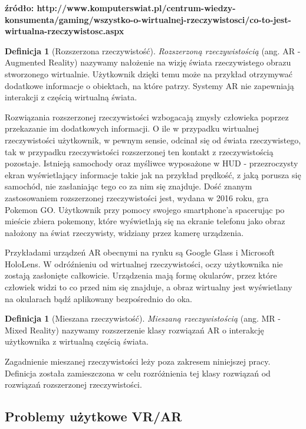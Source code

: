 \documentclass[a4paper,11pt,twoside]{report}
\theoremstyle{definition}
\newtheorem{definition}[theorem]{Definicja}
\begin{document}
\textbf {źródło: http://www.komputerswiat.pl/centrum-wiedzy-konsumenta/gaming/wszystko-o-wirtualnej-rzeczywistosci/co-to-jest-wirtualna-rzeczywistosc.aspx }

\begin{definition}[Rozszerzona rzeczywistość]
\textit{Rozszerzoną rzeczywistością} (ang. AR - Augmented Reality) nazywamy nałożenie na wizję świata rzeczywistego obrazu stworzonego wirtualnie. Użytkownik dzięki temu może na przykład otrzymywać dodatkowe informacje o obiektach, na które patrzy. Systemy AR nie zapewniają interakcji z częścią wirtualną świata.
\end{definition}

Rozwiązania rozszerzonej rzeczywistości wzbogacają zmysły człowieka poprzez przekazanie im dodatkowych informacji. O ile w przypadku wirtualnej rzeczywistości użytkownik, w pewnym sensie, odcinał się od świata rzeczywistego, tak w przypadku rzeczywistości rozszerzonej ten kontakt z rzeczywistością pozostaje. Istnieją samochody oraz myśliwce wyposażone w HUD - przezroczysty ekran wyświetlający informacje takie jak na przykład prędkość, z jaką porusza się samochód, nie zasłaniając tego co za nim się znajduje. Dość znanym zastosowaniem rozszerzonej rzeczywistości jest, wydana w 2016 roku, gra Pokemon GO. Użytkownik przy pomocy swojego smartphone'a spacerując po mieście zbiera pokemony, które wyświetlają się na ekranie telefonu jako obraz nałożony na  świat rzeczywisty, widziany przez kamerę urządzenia.

Przykładami urządzeń AR obecnymi na rynku są Google Glass i Microsoft HoloLens. W odróźnieniu od wirtualnej rzeczywistości, oczy użytkownika nie zostają zasłonięte całkowicie. Urządzenia mają formę okularów, przez które człowiek widzi to co przed nim się znajduje, a obraz wirtualny jest wyświetlany na okularach bądź aplikowany bezpośrednio do oka.

\begin{definition}[Mieszana rzeczywistość]
\textit{Mieszaną rzeczywistością} (ang. MR - Mixed Reality) nazywamy rozszerzenie klasy rozwiązań AR o interakcję użytkownika z wirtualną częścią świata.
\end{definition}

Zagadnienie mieszanej rzeczywistości leży poza zakresem niniejszej pracy. Definicja została zamieszczona w celu rozróżnienia tej klasy rozwiązań od rozwiązań rozszerzonej rzeczywistości.

\subsection{ Problemy użytkowe VR/AR }
\end{document}
